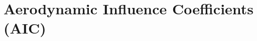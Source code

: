 \documentclass{article}
\begin{document}
\section{Aerodynamic Influence Coefficients (AIC)}




\end{document}
